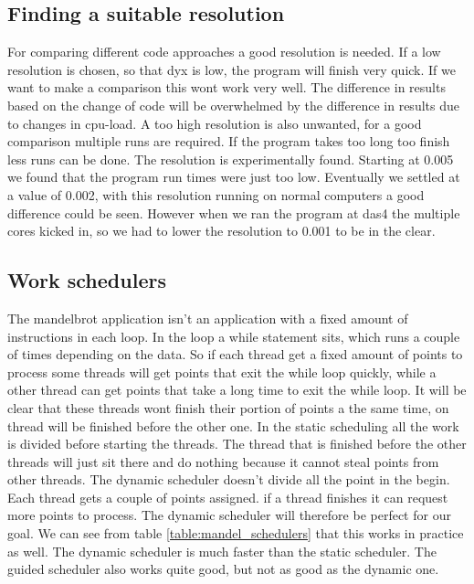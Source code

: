 \documentclass[a4paper]{article}
\begin{document}
\subsection{Finding a suitable resolution}
	For comparing different code approaches a good resolution is needed.
	If a low resolution is chosen, so that dyx is low, the program will finish very quick.
	If we want to make a comparison this wont work very well.
	The difference in results based on the change of code will be overwhelmed by the difference in results due to changes in cpu-load.
	A too high resolution is also unwanted, for a good comparison multiple runs are required.
	If the program takes too long too finish less runs can be done.
	The resolution is experimentally found.
	Starting at 0.005 we found that the program run times were just too low.
	Eventually we settled at a value of 0.002, with this resolution running on normal computers a good difference could be seen.
	However when we ran the program at das4 the multiple cores kicked in, so we had to lower the resolution to 0.001 to be in the clear.
	

\subsection{Work schedulers}
	The mandelbrot application isn't an application with a fixed amount of instructions in each loop.
	In the loop a while statement sits, which runs a couple of times depending on the data.
	So if each thread get a fixed amount of points to process some threads will get points that exit the while loop quickly, while a other thread can get points that take a long time to exit the while loop.
	It will be clear that these threads wont finish their portion of points a the same time, on thread will be finished before the other one.
	In the static scheduling all the work is divided before starting the threads.
	The thread that is finished before the other threads will just sit there and do nothing because it cannot steal points from other threads.
	The dynamic scheduler doesn't divide all the point in the begin. Each thread gets a couple of points assigned.
	if a thread finishes it can request more points to process. The dynamic scheduler will therefore be perfect for our goal.
	We can see from table \ref{table:mandel_schedulers} that this works in practice as well.
	The dynamic scheduler is much faster than the static scheduler.
	The guided scheduler also works quite good, but not as good as the dynamic one.
	
\end{document}
